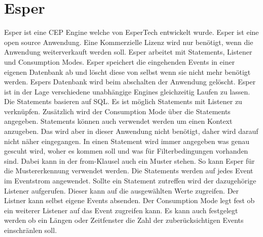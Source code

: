 \section{Esper}
Esper ist eine CEP Engine welche von EsperTech entwickelt wurde. Esper ist eine open source Anwendung. Eine Kommerzielle Lizenz wird nur benötigt, wenn die Anwendung weiterverkauft werden soll. Esper arbeitet mit Statements, Listener und Consumption Modes. Esper speichert die eingehenden Events in einer eigenen Datenbank ab und löscht diese von selbst wenn sie nicht mehr benötigt werden. Espers Datenbank wird beim abschalten der Anwendung gelöscht. Esper ist in der Lage verschiedene unabhängige Engines gleichzeitig Laufen zu lassen. 
\\ 
Die Statements basieren auf SQL. Es ist möglich Statements mit Listener zu verknüpfen. Zusätzlich wird der Consumption Mode über die Statements angegeben. Statements können auch verwendet werden um einen Kontext anzugeben. Das wird aber in dieser Anwendung nicht benötigt, daher wird darauf nicht näher eingegangen. In einen Statement wird immer angegeben was genau gescuht wird, woher es kommen soll und was für Filterbedingungen vorhanden sind. Dabei kann in der from-Klausel auch ein Muster stehen. So kann Esper für die Mustererkennung verwendet werden. Die Statements werden auf jedes Event im Eventstrom angewendet. Sollte ein Statement zutreffen wird der dazugehörige Listener aufgerufen. Dieser kann auf die ausgewählten Werte zugreifen. Der Listner kann selbst eigene Events absenden. Der Consumption Mode legt fest ob ein weiterer Listener auf das Event zugreifen kann. Es kann auch festgelegt werden ob ein Längen oder Zeitfenster die Zahl der zuberücksichtigen Events einschränlen soll.   

